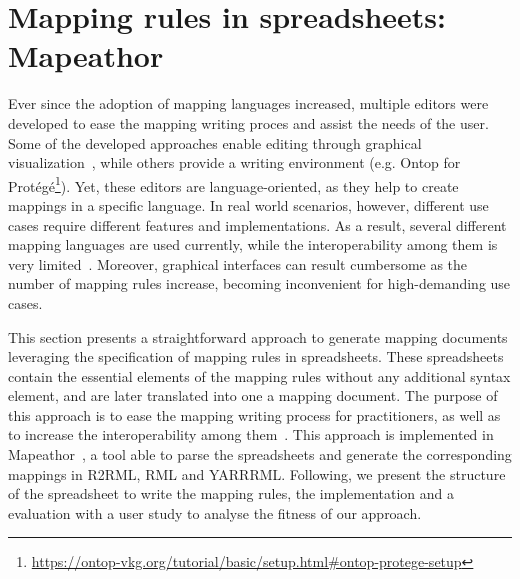 \section{Mapping rules in spreadsheets: Mapeathor}
\label{sec:chp5_mapeathor}

Ever since the adoption of mapping languages increased, multiple  editors were developed to ease the mapping writing proces and assist the needs of the user. Some of the developed approaches enable editing through graphical visualization~\parencite{heyvaert2016rmleditor,sicilia2017map}, while others provide a writing environment (e.g. Ontop for Protégé\footnote{\url{https://ontop-vkg.org/tutorial/basic/setup.html\#ontop-protege-setup}}). Yet, these editors are language-oriented, as they help to create mappings in a specific language. In real world scenarios, however, different use cases require different features and implementations. As a result, several different mapping languages are used currently, while the interoperability among them is very limited~\parencite{iglesias2022devising}. Moreover, graphical interfaces can result cumbersome as the number of mapping rules increase, becoming inconvenient for high-demanding use cases. 


This section presents a straightforward approach to generate mapping documents leveraging the specification of mapping rules in spreadsheets. These spreadsheets contain the essential elements of the mapping rules without any additional syntax element, and are later translated into one a mapping document. The purpose of this approach is to ease the mapping writing process for practitioners, as well as to increase the interoperability among them~\parencite{corcho2020towards, iglesias2022devising}. This approach is implemented in Mapeathor~\parencite{iglesias-molina_2023_5973906}, a tool able to parse the spreadsheets and generate the corresponding mappings in R2RML, RML and YARRRML. Following, we present the structure of the spreadsheet to write the mapping rules, the implementation and a evaluation with a user study to analyse the fitness of our approach.

